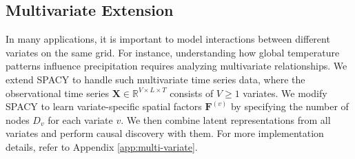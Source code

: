 


\subsection{Multivariate Extension}
In many applications, it is important to model interactions between different variates on the same grid. For instance, understanding how global temperature patterns influence precipitation requires analyzing multivariate relationships. We extend SPACY to handle such multivariate time series data, where the observational time series $\mathbf{X} \in \mathbb{R}^{V \times L \times T}$ consists of $V \geq 1$ variates. We modify SPACY to learn variate-specific spatial factors $\mathbf{F}^{(v)}$ by specifying the number of nodes $D_v$ for each variate $v$. We then combine latent representations from all variates and perform causal discovery with them. For more implementation details, refer to Appendix \ref{app:multi-variate}.